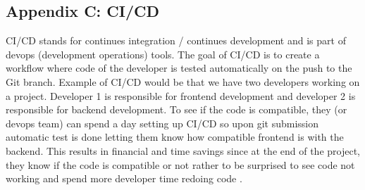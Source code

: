 \subsection{Appendix C: CI/CD}
CI/CD stands for continues integration / continues development and is part of devops (development operations) tools. The goal of CI/CD is to create a workflow where code of the developer is tested automatically on the push to the Git branch.
\newline
Example of CI/CD would be that we have two developers working on a project. Developer 1 is responsible for frontend development and developer 2 is responsible for backend development. To see if the code is compatible, they (or devops team) can spend a day setting up CI/CD so upon git submission automatic test is done letting them know how compatible frontend is with the backend. This results in financial and time savings since at the end of the project, they know if the code is compatible or not rather to be surprised to see code not working and spend more developer time redoing code \parencite{poth2018deliver}. 